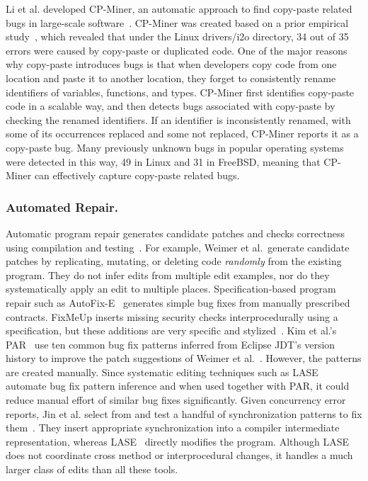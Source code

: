 \documentclass[runningheads,a4paper]{llncs}
\begin{document}
Li et al. developed CP-Miner, an automatic approach to find copy-paste related bugs in large-scale software~\cite{Li2006:CPMiner}. CP-Miner was created based on a prior empirical study~\cite{Chou2001:ESO}, which revealed that under the Linux {\sf drivers/i2o} directory, 34 out of 35 errors were caused by copy-paste or duplicated code. 
One of the major reasons why copy-paste introduces bugs is that when developers copy code from one location and paste it to another location, they forget to consistently rename identifiers of variables, functions, and types. CP-Miner first identifies copy-paste code in a scalable way, and then detects bugs associated with copy-paste by checking the renamed identifiers. If an identifier is inconsistently renamed, with some of its occurrences replaced and some not replaced, CP-Miner reports it as a copy-paste bug. Many previously unknown bugs in popular operating systems were detected in this way, 49 in Linux and 31 in FreeBSD, meaning that CP-Miner can effectively capture copy-paste related bugs. 

\subsubsection{Automated Repair.} 

Automatic program repair generates candidate patches and checks correctness using compilation and testing~\cite{Weimer2009:AFP}.  For example, Weimer et al.~generate candidate patches by replicating, mutating, or deleting code \emph{randomly} from the existing program. They do not infer edits from multiple edit examples, nor do they systematically apply an edit to multiple places. Specification-based program repair such as AutoFix-E~\cite{Wei:2010:AutoFix-E} generates simple bug fixes from manually prescribed contracts. FixMeUp inserts missing security checks interprocedurally using a specification, but these additions are very specific and stylized~\cite{son2013fix}.  
Kim et al.'s PAR~\cite{Kim2013:PAR} use ten common bug fix patterns inferred from Eclipse JDT's version history to improve the patch suggestions of Weimer et al.~\cite{Weimer2009:AFP}. However, the patterns are created manually. Since systematic editing techniques such as LASE automate bug fix pattern inference and when used together with PAR, it could reduce manual effort of similar bug fixes significantly. Given concurrency error reports, Jin et al. select from and test a handful of synchronization patterns to fix them~\cite{JZDLL:12}. They insert appropriate synchronization into a compiler intermediate representation, whereas LASE~\cite{Meng12:lase} directly modifies the program. Although LASE does not coordinate cross method or interprocedural changes, it handles a much larger class of edits than all these tools. 
\end{document}

